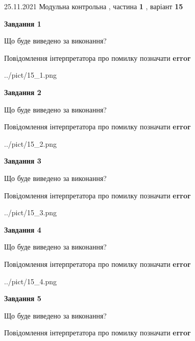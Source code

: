 \documentclass[10pt, ukrainian]{article}
\begin{document}
{25.11.2021 Модульна контрольна , частина \textbf { 1 }, варіант  \No \textbf { 15 }\par}
{
\begin {large}

{\begin {center}\textbf{Завдання 1}\end {center}}\par
Що буде виведено за виконання? \par
Повідомлення інтерпретатора про помилку позначати \textbf{error}

\begin{center}
	{../pict/15_1.png}
\end{center}
\newpage

{\begin {center}\textbf{Завдання 2}\end {center}}\par
Що буде виведено за виконання? \par
Повідомлення інтерпретатора про помилку позначати \textbf{error}

\begin{center}
	{../pict/15_2.png}
\end{center}
\newpage

{\begin {center}\textbf{Завдання 3}\end {center}}\par
Що буде виведено за виконання? \par
Повідомлення інтерпретатора про помилку позначати \textbf{error}

\begin{center}
	{../pict/15_3.png}
\end{center}
\newpage

{\begin {center}\textbf{Завдання 4}\end {center}}\par
Що буде виведено за виконання? \par
Повідомлення інтерпретатора про помилку позначати \textbf{error}

\begin{center}
	{../pict/15_4.png}
\end{center}
\newpage

{\begin {center}\textbf{Завдання 5}\end {center}}\par
Що буде виведено за виконання? \par
Повідомлення інтерпретатора про помилку позначати \textbf{error}


\end{large}}
\end{document}
